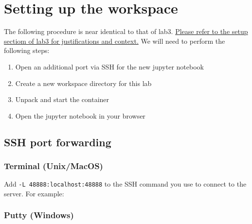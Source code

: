 \documentclass[
]{book}
\newenvironment{Shaded}{\begin{snugshade}}{\end{snugshade}}
\newcommand{\AttributeTok}[1]{\textcolor[rgb]{0.13,0.29,0.53}{#1}}
\newcommand{\FunctionTok}[1]{\textcolor[rgb]{0.13,0.29,0.53}{\textbf{#1}}}
\newcommand{\NormalTok}[1]{#1}
\newcommand{\VariableTok}[1]{\textcolor[rgb]{0.00,0.00,0.00}{#1}}
\providecommand{\tightlist}{%
  \setlength{\itemsep}{0pt}\setlength{\parskip}{0pt}}
\begin{document}
\section{Setting up the workspace}\label{setting-up-the-workspace-1}

The following procedure is near identical to that of lab3.
\href{module-3---lab-practical.html\#setting-up-the-workspace}{Please refer to the setup sectiom of lab3 for justifications and context.}
We will need to perform the following steps:

\begin{enumerate}
\def\labelenumi{\arabic{enumi}.}
\tightlist
\item
  Open an additional port via SSH for the new jupyter notebook
\item
  Create a new workspace directory for this lab
\item
  Unpack and start the container
\item
  Open the jupyter notebook in your browser
\end{enumerate}

\subsection{SSH port forwarding}\label{ssh-port-forwarding-1}

\subsubsection{Terminal (Unix/MacOS)}\label{terminal-unixmacos-1}

Add \texttt{-L\ 48888:localhost:48888} to the SSH command you use to connect to the server. For example:

\begin{Shaded}
\end{Shaded}

\subsubsection{Putty (Windows)}\label{putty-windows-1}
\end{document}
